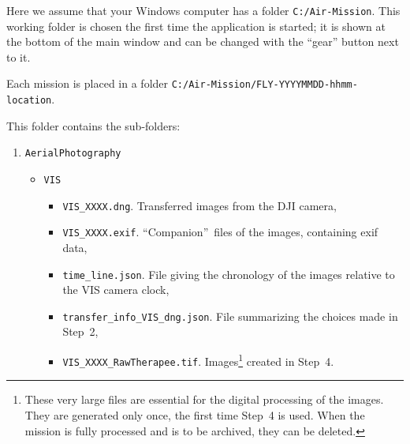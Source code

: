 \documentclass[a4paper,11pt]{report}
\newcommand{\todo}[1]{\textcolor{red}{[To be written: #1]}}
\begin{document}
Here we assume that your Windows computer has a folder \texttt{C:/Air-Mission}.
This working folder is chosen the first time the application is started; it is shown at the bottom of the main
window and can be changed with the ``gear'' button next to it.

Each mission is placed in a folder \texttt{C:/Air-Mission/FLY-YYYYMMDD-hhmm-location}.

This folder contains the sub-folders:
\begin{enumerate}
	\item \texttt{AerialPhotography}
	      \begin{itemize}
	      	\item \texttt{VIS}
	      	  \begin{itemize}
	      	  	\item \texttt{VIS\_XXXX.dng}. Transferred images from the DJI camera,
	      	  	\item \texttt{VIS\_XXXX.exif}. ``Companion''~files of the images, containing exif data,
	      	  	\item \texttt{time\_line.json}. File giving the chronology of the images relative to the VIS camera clock,
	      	  	\item \texttt{transfer\_info\_VIS\_dng.json}. File summarizing the choices made in Step~2,
	      	  	\item \texttt{VIS\_XXXX\_RawTherapee.tif}. Images\footnote{\label{fn:rawtherapee_1}These very large files are essential for the digital processing of the images. They are generated only once, the first time Step~4 is used. When the mission is fully processed and is to be archived, they can be deleted.} created in Step~4.
	      	  \end{itemize}


\end{itemize}
\end{enumerate}
\end{document}
